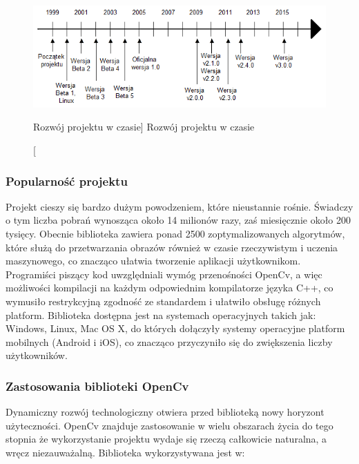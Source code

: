 \documentclass[a4paper,12pt]{article}
\newcommand\spacingIndent{2.2em}
\begin{document}
				 
	            \newpage
				\begin{figure}[!ht]   
					\begin{center}
		    				\includegraphics[width=\linewidth] {image//osCzasu.png} 
					\end{center}
					\caption
					    [Rozwój projektu w czasie]  
					    {Rozwój projektu w czasie}  
				\end{figure}


		\subsubsection{Popularność projektu}  
			\hspace{\spacingIndent} Projekt cieszy się bardzo dużym powodzeniem, które nieustannie rośnie. Świadczy o tym liczba pobrań 
				wynosząca około 14 milionów razy, zaś miesięcznie około 200 tysięcy. Obecnie biblioteka zawiera ponad 2500 zoptymalizowanych algorytmów, 
				które służą do przetwarzania obrazów również w czasie rzeczywistym i uczenia maszynowego, co znacząco ułatwia tworzenie aplikacji użytkownikom. 
				Programiści piszący kod uwzględniali wymóg przenośności OpenCv, a więc możliwości kompilacji na każdym odpowiednim kompilatorze języka C++, 
				co wymusiło restrykcyjną zgodność ze standardem i ułatwiło obsługę różnych platform. Biblioteka dostępna jest na systemach operacyjnych takich jak: 
				Windows, Linux, Mac OS X, do których dołączyły systemy operacyjne platform mobilnych (Android i iOS), co znacząco przyczyniło się do zwiększenia liczby użytkowników.

		\subsubsection{Zastosowania biblioteki OpenCv}
			\hspace{\spacingIndent} Dynamiczny rozwój technologiczny otwiera przed biblioteką nowy horyzont użyteczności. 
				OpenCv znajduje zastosowanie w wielu obszarach życia do tego stopnia że wykorzystanie projektu wydaje się rzeczą całkowicie naturalna,
				a wręcz niezauważalną. Biblioteka wykorzystywana jest w:
			
\end{document}
